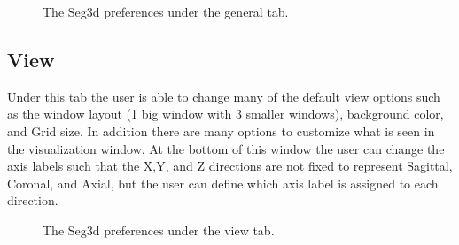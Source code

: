 \documentclass[fleqn,11pt,openany]{book}
\begin{document}
\begin{figure}[h!]
\caption{The Seg3d preferences under the general tab.}\label{fig:Pref_gen}
\end{figure}


\subsection{View}
Under this tab the user is able to change many of the default view options such as the window layout (1 big window with 3 smaller windows), background color, and Grid size. In addition there are many options to customize what is seen in the visualization window.  At the bottom of this window the user can change the axis labels such that the X,Y, and Z directions
are not fixed to represent Sagittal, Coronal, and Axial, but the user can define which axis label is assigned to each direction.

\begin{figure}[h!]
\caption{The Seg3d preferences under the view tab.}\label{fig:Pref_view}
\end{figure}
\end{document}
